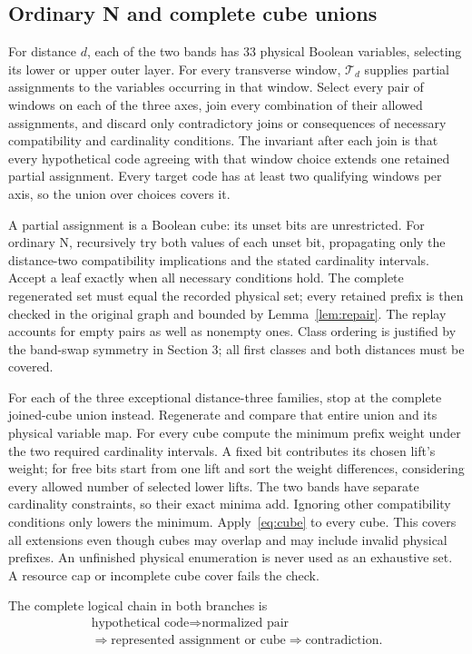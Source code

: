 \documentclass[11pt]{article}
\theoremstyle{definition}
\begin{document}
\subsection{Ordinary N and complete cube unions}
For distance $d$, each of the two bands has 33 physical Boolean variables,
selecting its lower or upper outer layer. For every transverse window,
$\mathcal T_d$ supplies partial assignments to the variables occurring
in that window. Select every pair of windows on each of the three axes,
join every combination of their allowed assignments, and discard only
contradictory joins or consequences of necessary compatibility and
cardinality conditions. The invariant after each join is that every
hypothetical code agreeing with that window choice extends one retained
partial assignment. Every target code has at least two qualifying
windows per axis, so the union over choices covers it.

A partial assignment is a Boolean cube: its unset bits are unrestricted.
For ordinary N, recursively try both values of each unset bit, propagating
only the distance-two compatibility implications and the stated
cardinality intervals. Accept a leaf exactly when all necessary conditions
hold. The complete regenerated set must equal the recorded physical set;
every retained prefix is then checked in the original graph and bounded
by Lemma~\ref{lem:repair}. The replay accounts for empty pairs as well
as nonempty ones. Class ordering is justified by the band-swap symmetry
in Section 3; all first classes and both distances must be covered.

For each of the three exceptional distance-three families, stop at the
complete joined-cube union instead. Regenerate and compare that entire
union and its physical variable map. For every cube compute the minimum
prefix weight under the two required cardinality intervals. A fixed bit
contributes its chosen lift's weight; for free bits start from one lift
and sort the weight differences, considering every allowed number of
selected lower lifts. The two bands have separate cardinality constraints,
so their exact minima add. Ignoring other compatibility conditions only
lowers the minimum. Apply~\eqref{eq:cube} to every cube. This covers
all extensions even though cubes may overlap and may include invalid
physical prefixes. An unfinished physical enumeration is never used as
an exhaustive set. A resource cap or incomplete cube cover fails the check.

The complete logical chain in both branches is
\[
\begin{gathered}
\text{hypothetical code}\Longrightarrow\text{normalized pair}\\
\Longrightarrow\text{represented assignment or cube}\Longrightarrow\text{contradiction}.
\end{gathered}
\]
\end{document}
